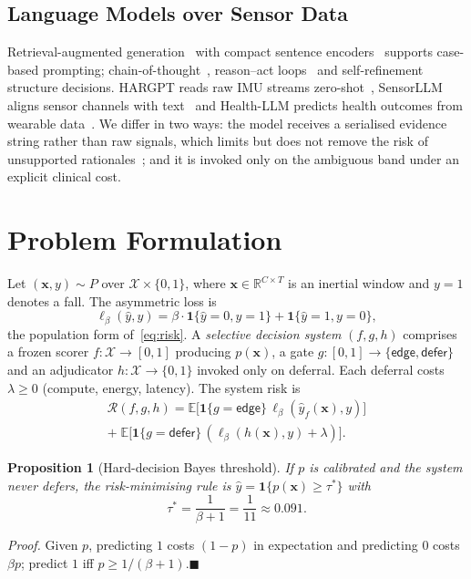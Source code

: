 \documentclass[journal]{IEEEtran}
\newtheorem{proposition}{Proposition}
\newcommand{\proofpar}[1]{\par\noindent\textit{Proof.} #1\hfill$\blacksquare$\par\medskip}
\begin{document}
\subsection{Language Models over Sensor Data}
Retrieval-augmented generation~\cite{lewis2020rag} with compact sentence encoders~\cite{minilm2020,reimers2019sbert} supports case-based prompting; chain-of-thought~\cite{wei2022cot}, reason--act loops~\cite{yao2023react} and self-refinement~\cite{madaan2023selfrefine} structure decisions. HARGPT reads raw IMU streams zero-shot~\cite{ji2024hargpt}, SensorLLM aligns sensor channels with text~\cite{li2024sensorllm} and Health-LLM predicts health outcomes from wearable data~\cite{kim2024healthllm}. We differ in two ways: the model receives a serialised evidence string rather than raw signals, which limits but does not remove the risk of unsupported rationales~\cite{huang2025hallucination,singhal2023medpalm}; and it is invoked only on the ambiguous band under an explicit clinical cost.

\section{Problem Formulation}
\label{sec:problem}

Let $(\mathbf{x},y)\sim P$ over $\mathcal{X}\times\{0,1\}$, where $\mathbf{x}\in\mathbb{R}^{C\times T}$ is an inertial window and $y{=}1$ denotes a fall. The asymmetric loss is
\begin{equation}
\ell_\beta(\hat{y},y)=\beta\cdot\mathbf{1}\{\hat{y}{=}0,y{=}1\}+\mathbf{1}\{\hat{y}{=}1,y{=}0\},
\label{eq:loss}
\end{equation}
the population form of~\eqref{eq:risk}. A \emph{selective decision system} $(f,g,h)$ comprises a frozen scorer $f:\mathcal{X}\to[0,1]$ producing $p(\mathbf{x})$, a gate $g:[0,1]\to\{\textsf{edge},\textsf{defer}\}$ and an adjudicator $h:\mathcal{X}\to\{0,1\}$ invoked only on deferral. Each deferral costs $\lambda\ge 0$ (compute, energy, latency). The system risk is
\begin{multline}
\mathcal{R}(f,g,h)=\mathbb{E}\big[\mathbf{1}\{g{=}\textsf{edge}\}\,\ell_\beta(\hat{y}_f(\mathbf{x}),y)\big]\\
+\;\mathbb{E}\big[\mathbf{1}\{g{=}\textsf{defer}\}\,(\ell_\beta(h(\mathbf{x}),y)+\lambda)\big].
\label{eq:selrisk}
\end{multline}

\begin{proposition}[Hard-decision Bayes threshold]
\label{prop:bayes}
If $p$ is calibrated and the system never defers, the risk-minimising rule is $\hat{y}=\mathbf{1}\{p(\mathbf{x})\ge\tau^\ast\}$ with
\begin{equation}
\tau^{\ast}=\frac{1}{\beta+1}=\frac{1}{11}\approx 0.091 .
\label{eq:tau_star}
\end{equation}
\end{proposition}
\proofpar{Given $p$, predicting $1$ costs $(1-p)$ in expectation and predicting $0$ costs $\beta p$; predict $1$ iff $p\ge 1/(\beta{+}1)$.}
\end{document}
